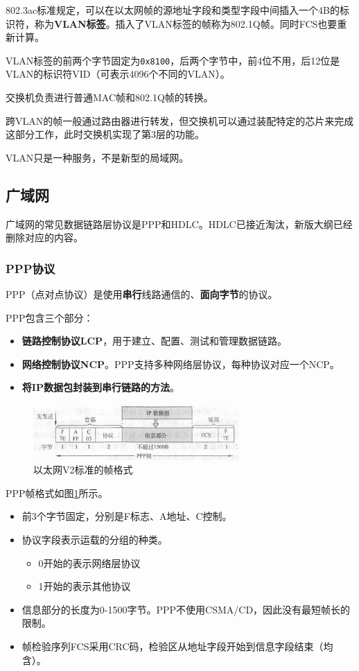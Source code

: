 \documentclass[12pt, a4paper, oneside]{ctexart}
\begin{document}
802.3ac标准规定，可以在以太网帧的源地址字段和类型字段中间插入一个4B的标识符，称为\textbf{VLAN标签}。插入了VLAN标签的帧称为802.1Q帧。同时FCS也要重新计算。

VLAN标签的前两个字节固定为\verb|0x8100|，后两个字节中，前4位不用，后12位是VLAN的标识符VID（可表示4096个不同的VLAN）。

交换机负责进行普通MAC帧和802.1Q帧的转换。

跨VLAN的帧一般通过路由器进行转发，但交换机可以通过装配特定的芯片来完成这部分工作，此时交换机实现了第3层的功能。

VLAN只是一种服务，不是新型的局域网。

\subsection{广域网}

广域网的常见数据链路层协议是PPP和HDLC。HDLC已接近淘汰，新版大纲已经删除对应的内容。

\subsubsection{PPP协议}

PPP（点对点协议）是使用\textbf{串行}线路通信的、\textbf{面向字节}的协议。

PPP包含三个部分：
\begin{itemize}
    \item {\bf 链路控制协议LCP}，用于建立、配置、测试和管理数据链路。
    \item {\bf 网络控制协议NCP}。PPP支持多种网络层协议，每种协议对应一个NCP。
    \item {\bf 将IP数据包封装到串行链路的方法}。
\end{itemize}

\begin{figure}[h]
    \centering
    \includegraphics[width=0.7\textwidth]{./images/ppp-frame.png}
    \caption{以太网V2标准的帧格式}
    \label{ppp-frame}
\end{figure}

PPP帧格式如图\ref{ppp-frame}所示。
\begin{itemize}
    \item 前3个字节固定，分别是F标志、A地址、C控制。
    \item 协议字段表示运载的分组的种类。
    \begin{itemize}
        \item 0开始的表示网络层协议
        \item 1开始的表示其他协议
    \end{itemize}
    \item 信息部分的长度为0-1500字节。PPP不使用CSMA/CD，因此没有最短帧长的限制。
    \item 帧检验序列FCS采用CRC码，检验区从地址字段开始到信息字段结束（均含）。
\end{itemize}
\end{document}
